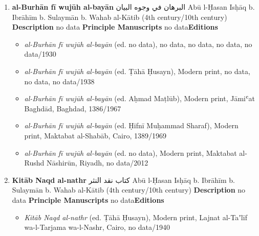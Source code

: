 \documentclass{article}
\begin{document}
\begin{enumerate}
      \item \textbf{al-Burhān fī wujūh al-bayān}
        \newline
        \textarabic{البرهان في وجوه البيان}
        \newline
        Abū l-Ḥasan Isḥāq b. Ibrāhīm b. Sulaymān b. Wahab al-Kātib
        \newline
        (4th century/10th century)
        \newline
        \newline
        \textbf{Description}
        \newline	
        no data
        \newline
        \newline
    \textbf{Principle Manuscripts}
\newline
no data\newline\textbf{Editions}
\begin{itemize}
        \item \emph{al-Burhān fī wujūh al-bayān} (ed. no data), no data, no data, no data, no data/1930
        
        \item \emph{al-Burhān fī wujūh al-bayān} (ed. Ṭāhā Ḥusayn), Modern print, no data, no data, no data/1938
        
        \item \emph{al-Burhān fī wujūh al-bayān} (ed. Aḥmad Maṭlūb), Modern print, Jāmiʿat Baghdād, Baghdad, 1386/1967
        
        \item \emph{al-Burhān fī wujūh al-bayān} (ed. Ḥifnī Muḥammad Sharaf), Modern print, Maktabat al-Shabāb, Cairo, 1389/1969
        
        \item \emph{al-Burhān fī wujūh al-bayān} (ed. no data), Modern print, Maktabat al-Rushd Nāshirūn, Riyadh, no data/2012
        \end{itemize}

      \item \textbf{Kitāb Naqd al-nathr}
        \newline
        \textarabic{كتاب نقد النثر}
        \newline
        Abū l-Ḥasan Isḥāq b. Ibrāhīm b. Sulaymān b. Wahab al-Kātib
        \newline
        (4th century/10th century)
        \newline
        \newline
        \textbf{Description}
        \newline	
        no data
        \newline
        \newline
    \textbf{Principle Manuscripts}
\newline
no data\newline\textbf{Editions}
\begin{itemize}
        \item \emph{Kitāb Naqd al-nathr} (ed. Ṭāhā Ḥusayn), Modern print, Lajnat al-Taʼlīf wa-l-Tarjama wa-l-Nashr, Cairo, no data/1940
        

\end{itemize}
\end{enumerate}
\end{document}
